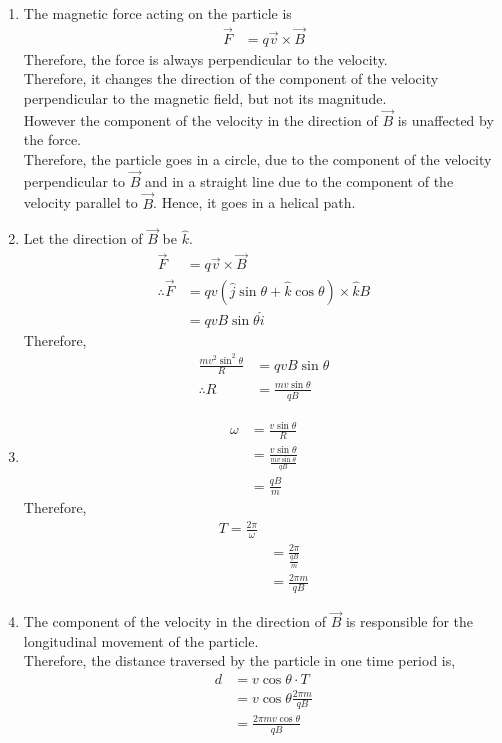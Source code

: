 \documentclass[fleqn, a4paper, 12pt, twoside]{article}
\theoremstyle{definition}
\theoremstyle{theorem}
\begin{document}
\begin{solution}
	\begin{enumerate}
		\item
			The magnetic force acting on the particle is
			\begin{align*}
				\overrightarrow{F} &= q \overrightarrow{v} \times \overrightarrow{B}
			\end{align*}
			Therefore, the force is always perpendicular to the velocity.\\
			Therefore, it changes the direction of the component of the velocity perpendicular to the magnetic field, but not its magnitude.\\
			However the component of the velocity in the direction of $\overrightarrow{B}$ is unaffected by the force.\\
			Therefore, the particle goes in a circle, due to the component of the velocity perpendicular to $\overrightarrow{B}$ and in a straight line due to the component of the velocity parallel to $\overrightarrow{B}$.
			Hence, it goes in a helical path.
		\item
			Let the direction of $\overrightarrow{B}$ be $\hat{k}$.
			\begin{align*}
				\overrightarrow{F} &= q \overrightarrow{v} \times \overrightarrow{B}\\
				\therefore \overrightarrow{F} &= q v \left( \hat{j} \sin \theta + \hat{k} \cos \theta \right) \times \hat{k} B\\
				&= q v B \sin \theta \hat{i}
			\end{align*}
			Therefore,
			\begin{align*}
				\frac{m v^2 \sin^2 \theta}{R} &= q v B \sin \theta\\
				\therefore R &= \frac{m v \sin \theta}{q B}
			\end{align*}
		\item
			\begin{align*}
				\omega &= \frac{v \sin \theta}{R}\\
				&= \frac{v \sin \theta}{\frac{m v \sin \theta}{q B}}\\
				&= \frac{q B}{m}
			\end{align*}
			Therefore,
			\begin{align*}
				T = \frac{2 \pi}{\omega}\\
				&= \frac{2 \pi}{\frac{q B}{m}}\\
				&= \frac{2 \pi m}{q B}
			\end{align*}
		\item
			The component of the velocity in the direction of $\overrightarrow{B}$ is responsible for the longitudinal movement of the particle.\\
			Therefore, the distance traversed by the particle in one time period is,
			\begin{align*}
				d &= v \cos \theta \cdot T\\
				&= v \cos \theta \frac{2 \pi m}{q B}\\
				&= \frac{2 \pi m v \cos \theta}{q B}
			\end{align*}
	\end{enumerate}
\end{solution}
\end{document}
